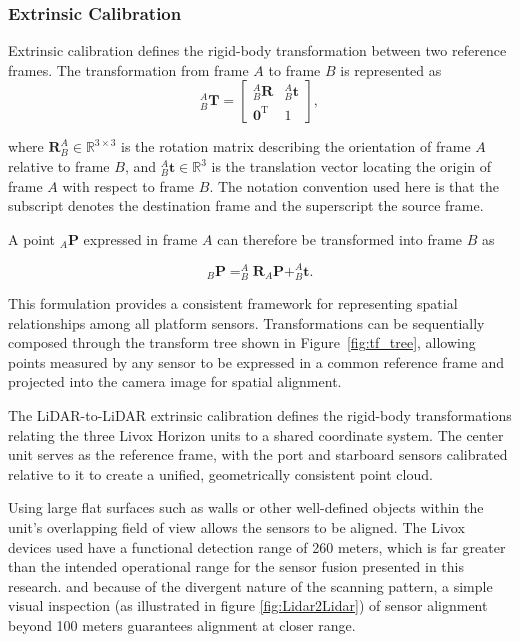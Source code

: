 \documentclass{erauthesis}
\begin{document}
\subsubsection{Extrinsic Calibration} \label{extrinsic_tform}

Extrinsic calibration defines the rigid-body transformation between two reference frames.  
The transformation from frame $A$ to frame $B$ is represented as
\begin{equation}
    _{B}^{A}\mathbf{T} =
    \begin{bmatrix}
        _{B}^{A}\mathbf{R} & _{B}^{A}\mathbf{t} \\
        \mathbf{0}^\mathrm{T} & 1
    \end{bmatrix},
\end{equation}

where $\mathbf{R}_{B}^{A} \in \mathbb{R}^{3\times3}$ is the rotation matrix describing the orientation of frame $A$ relative to frame $B$, and $_{B}^{A}\mathbf{t} \in \mathbb{R}^{3}$ is the translation vector locating the origin of frame $A$ with respect to frame $B$.  
The notation convention used here is that the subscript denotes the destination frame and the superscript the source frame.

A point $_{A}\mathbf{P}$ expressed in frame $A$ can therefore be transformed into frame $B$ as

\begin{equation}
    _{B}\mathbf{P} =
    _{B}^{A}\mathbf{R} _{A}\mathbf{P} + _{B}^{A}\mathbf{t}.
\end{equation}

This formulation provides a consistent framework for representing spatial relationships among all platform sensors.  
Transformations can be sequentially composed through the transform tree shown in Figure~\ref{fig:tf_tree}, allowing points measured by any sensor to be expressed in a common reference frame and projected into the camera image for spatial alignment.

The \ac{LiDAR}-to-\ac{LiDAR} extrinsic calibration defines the rigid-body transformations relating the three Livox Horizon units to a shared coordinate system.  
The center unit serves as the reference frame, with the port and starboard sensors calibrated relative to it to create a unified, geometrically consistent point cloud.

Using large flat surfaces such as walls or other well-defined objects within the unit's overlapping field of view allows the sensors to be aligned.
The Livox devices used have a functional detection range of 260 meters, which is far greater than the intended operational range for the sensor fusion presented in this research. 
and because of the divergent nature of the scanning pattern, a simple visual inspection  (as illustrated in figure \ref{fig:Lidar2Lidar}) of sensor alignment beyond 100 meters guarantees alignment at closer range. 
\end{document}
